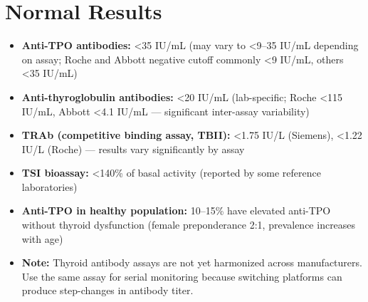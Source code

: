 \section*{Normal Results}
\begin{itemize}
  \item \textbf{Anti-TPO antibodies:} <35 IU/mL (may vary to <9--35 IU/mL depending on assay; Roche and Abbott negative cutoff commonly <9 IU/mL, others <35 IU/mL)
  \item \textbf{Anti-thyroglobulin antibodies:} <20 IU/mL (lab-specific; Roche <115 IU/mL, Abbott <4.1 IU/mL --- significant inter-assay variability)
  \item \textbf{TRAb (competitive binding assay, TBII):} <1.75 IU/L (Siemens), <1.22 IU/L (Roche) --- results vary significantly by assay
  \item \textbf{TSI bioassay:} <140\% of basal activity (reported by some reference laboratories)
  \item \textbf{Anti-TPO in healthy population:} 10--15\% have elevated anti-TPO without thyroid dysfunction (female preponderance 2:1, prevalence increases with age)
  \item \textbf{Note:} Thyroid antibody assays are not yet harmonized across manufacturers. Use the same assay for serial monitoring because switching platforms can produce step-changes in antibody titer.
\end{itemize}


